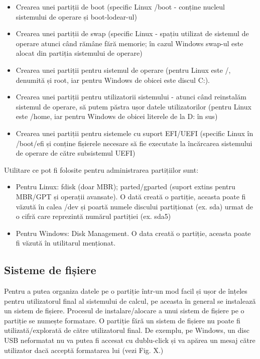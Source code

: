 \begin{itemize}
	\item Crearea unei partiții de boot (specific Linux /boot - conține
		nucleul sistemului de operare și boot-lodear-ul)
	\item Crearea unei partiții de swap (specific Linux - spațiu utilizat de
		sistemul de operare atunci când rămâne fără memorie; în cazul
		Windows swap-ul este alocat din partiția sistemului de operare)
	\item Crearea unei partiții pentru sistemul de operare (pentru Linux
		este /, denumită și root, iar pentru Windows de obicei este
		discul C:).
	\item Crearea unei partiții pentru utilizatorii sistemului - atunci când
		reinstalăm sistemul de operare, să putem păstra ușor datele
		utilizatorilor (pentru Linux este /home, iar pentru Windows de
		obicei literele de la D: în sus)
	\item Crearea unei partiții pentru sistemele cu suport EFI/UEFI
		(specific Linux în /boot/efi și conține fișierele necesare să
		fie executate la încărcarea sistemului de operare de către
		subsistemul UEFI)
\end{itemize}

Utilitare ce pot fi folosite pentru administrarea partițiilor sunt:

\begin{itemize}
	\item Pentru Linux: fdisk (doar MBR); parted/gparted (suport extins
		pentru MBR/GPT și operații avansate). O dată creată o partiție,
		aceasta poate fi văzută în calea /dev și poartă numele discului
		partiționat (ex. sda) urmat de o cifră care reprezintă numărul
		partiției (ex. sda5)
	\item Pentru Windows: Disk Management. O data creată o partiție, aceasta
		poate fi văzută în utilitarul menționat.
\end{itemize}

\subsection{Sisteme de fișiere}
\label{sec:storage-fs}

Pentru a putea organiza datele pe o partiție într-un mod facil și ușor de
înțeles pentru utilizatorul final al sistemului de calcul, pe aceasta în general
se instalează un sistem de fișiere. Procesul de instalare/alocare a unui sistem
de fișiere pe o partiție se numește formatare. O partiție fără un sistem de
fișiere nu poate fi utilizată/explorată de către utilizatorul final. De exemplu,
pe Windows, un disc USB neformatat nu va putea fi accesat cu dublu-click și va
apărea un mesaj către utilizator dacă acceptă formatarea lui (vezi Fig. X.)

